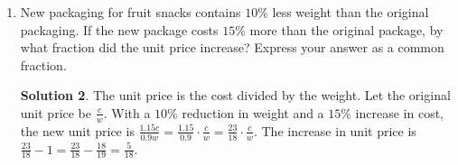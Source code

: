 \documentclass{article}
\theoremstyle{definition}
\newtheorem*{solution}{Solution}
\begin{document}
\begin{enumerate}
\begin{solution}
        \end{solution}
        \item New packaging for fruit snacks contains $10\%$ less weight than the original packaging. If the new package costs $15\%$ more than the original package, by what fraction did the unit price increase? Express your answer as a common fraction.
        \begin{solution}
            The unit price is the cost divided by the weight. Let the original unit price be $\frac{c}{w}$. With a $10\%$ reduction in weight and a $15\%$ increase in cost, the new unit price is $\frac{1.15c}{0.9w} = \frac{1.15}{0.9} \cdot \frac{c}{w} = \frac{23}{18} \cdot \frac{c}{w}$. The increase in unit price is $\frac{23}{18} - 1 = \frac{23}{18} - \frac{18}{19} = \frac{5}{18}$.
        \end{solution}
    \end{enumerate}
\end{document}
